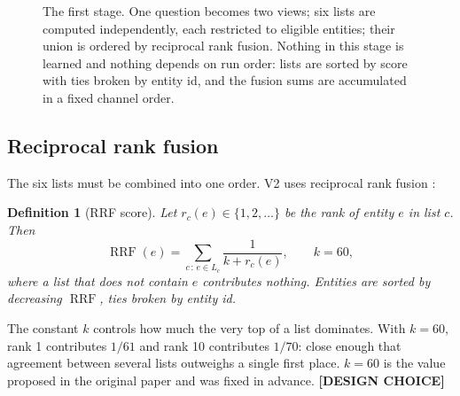 \documentclass[11pt,a4paper]{article}
\newtheorem{definition}{Definition}[section]
\theoremstyle{remark}
\DeclareMathOperator{\RRF}{RRF}
\newcommand{\vtag}[2]{{\sffamily\scriptsize\bfseries\textcolor{#1}{[#2]}}}
\newcommand{\Dtag}{\vtag{black!60}{DESIGN CHOICE}}
\begin{document}
\begin{figure}[!htbp]
{}
\caption[Multi-channel first-stage architecture]{The first stage. One question becomes two views; six lists are computed
independently, each restricted to eligible entities; their union is ordered by reciprocal
rank fusion. Nothing in this stage is learned and nothing depends on run order: lists are
sorted by score with ties broken by entity id, and the fusion sums are accumulated in a
fixed channel order.}
\label{fig:architecture}
\end{figure}

\subsection{Reciprocal rank fusion}

The six lists must be combined into one order. V2 uses reciprocal rank fusion
\citep{cormack2009rrf}:

\begin{definition}[RRF score]
\label{def:rrf}
Let $r_c(e)\in\{1,2,\dots\}$ be the rank of entity $e$ in list $c$. Then
\begin{equation}
  \RRF(e)=\sum_{c\,:\,e\in L_c}\frac{1}{k+r_c(e)},\qquad k=60,
\label{eq:rrf}
\end{equation}
where a list that does not contain $e$ contributes nothing. Entities are sorted by
decreasing $\RRF$, ties broken by entity id.
\end{definition}

The constant $k$ controls how much the very top of a list dominates. With $k=60$, rank 1
contributes $1/61$ and rank 10 contributes $1/70$: close enough that agreement between
several lists outweighs a single first place. $k=60$ is the value proposed in the
original paper and was fixed in advance. \Dtag
\end{document}
